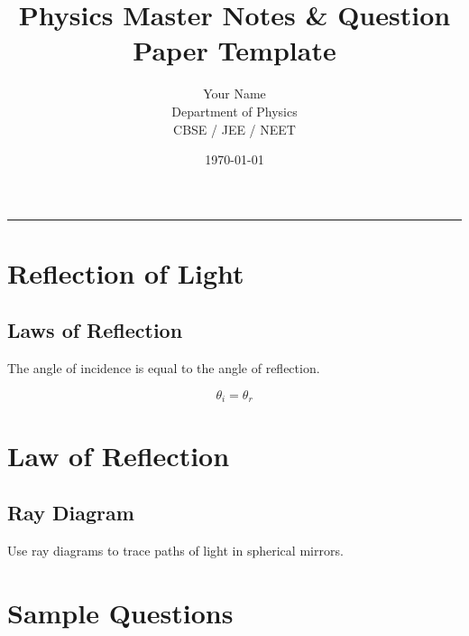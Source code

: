 \documentclass[11pt,a4paper]{extarticle}
\title{\Huge Physics Master Notes \& Question Paper Template}
\author{Your Name \\ \small Department of Physics \\ \small CBSE / JEE / NEET}
\date{\today}
\begin{document}
\maketitle
\hrule
\vspace{1em}


\section{Reflection of Light}
\subsection{Laws of Reflection}
\begin{noteBox}
The angle of incidence is equal to the angle of reflection.
\end{noteBox}

\begin{formulaBox}
\[
\theta_i = \theta_r
\]
\end{formulaBox}
\section{Law of Reflection}

\subsection{Ray Diagram}
\begin{center}
\end{center}

\begin{tipBox}
Use ray diagrams to trace paths of light in spherical mirrors.
\end{tipBox}

\section*{Sample Questions}
\end{document}
